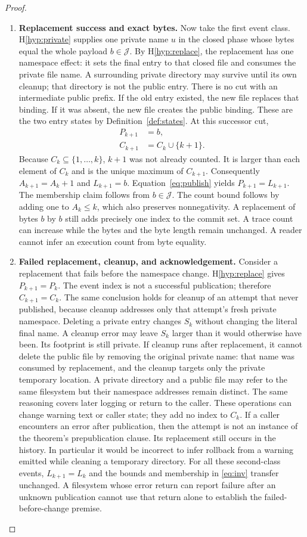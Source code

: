 \documentclass[12pt]{article}
\newcommand{\Valid}{\mathcal{J}}
\begin{document}
\begin{proof}
\begin{enumerate}
\item \textbf{Replacement success and exact bytes.}
Now take the first event class. H\ref{hyp:private} supplies
one private name $u$ in the closed phase whose bytes equal
the whole payload $b\in\Valid$.
By H\ref{hyp:replace}, the replacement has one namespace effect:
it sets the final entry to that closed file and consumes the
private file name. A surrounding private directory may survive
until its own cleanup; that directory is not the public entry.
There is no cut with an intermediate public prefix.
If the old entry existed, the new file replaces that binding.
If it was absent, the new file creates the public binding.
These are the two entry states by Definition~\ref{def:states}.
At this successor cut,
\begin{align}
\label{eq:publish}
     P_{k+1} &= b,\\
     C_{k+1} &= C_k\cup\{k+1\}.
\end{align}
Because $C_k\subseteq\{1,\ldots,k\}$, $k+1$ was not already
counted. It is larger than each element of $C_k$ and is
the unique maximum of $C_{k+1}$.
Consequently $A_{k+1}=A_k+1$ and $L_{k+1}=b$.
Equation~\eqref{eq:publish} yields $P_{k+1}=L_{k+1}$.
The membership claim follows from $b\in\Valid$.
The count bound follows by adding one to $A_k\leq k$,
which also preserves nonnegativity.
A replacement of bytes $b$ by $b$ still adds precisely one
index to the commit set. A trace count can increase while the
bytes and the byte length remain unchanged.
A reader cannot infer an execution count from byte equality.

\item \textbf{Failed replacement, cleanup, and acknowledgement.}
Consider a replacement that fails before the namespace change.
H\ref{hyp:replace} gives $P_{k+1}=P_k$.
The event index is not a successful publication;
therefore $C_{k+1}=C_k$.
The same conclusion holds for cleanup of an attempt that never
published, because cleanup addresses only that attempt's fresh
private namespace. Deleting a private entry changes $S_k$ without
changing the literal final name.
A cleanup error may leave $S_k$ larger than it would otherwise
have been. Its footprint is still private.
If cleanup runs after replacement, it cannot delete the public
file by removing the original private name:
that name was consumed by replacement, and the cleanup targets
only the private temporary location.
A private directory and a public file may refer to the same
filesystem but their namespace addresses remain distinct.
The same reasoning covers later logging or return to the caller.
These operations can change warning text or caller state;
they add no index to $C_k$.
If a caller encounters an error after publication, then the
attempt is not an instance of the theorem's prepublication clause.
Its replacement still occurs in the history.
In particular it would be incorrect to infer rollback from
a warning emitted while cleaning a temporary directory.
For all these second-class events, $L_{k+1}=L_k$ and the
bounds and membership in \eqref{eq:inv} transfer unchanged.
A filesystem whose error return can report failure after an
unknown publication cannot use that return alone to establish
the failed-before-change premise.


\end{enumerate}
\end{proof}
\end{document}
